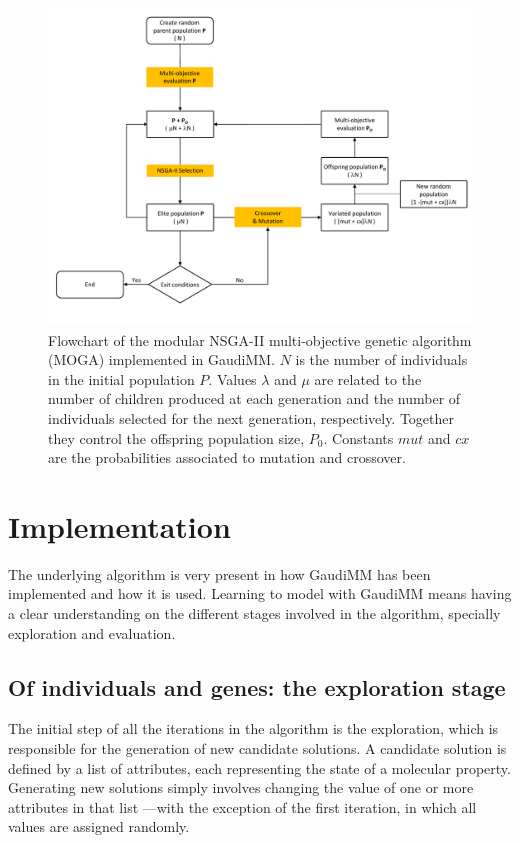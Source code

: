 \begin{figure} %
	\vspace*{-1cm}
	\includegraphics[width=0.85\textheight,angle=90]{./figures/04/nsga.pdf}
	\cprotect\caption[NSGA-II algorithm]{Flowchart of the modular NSGA-II multi-objective genetic algorithm (MOGA) implemented in GaudiMM. $ N $ is the number of individuals in the initial population $P$. Values $\lambda$ and $\mu$ are related to the number of children produced at each generation and the number of individuals selected for the next generation, respectively. Together they control the offspring population size, $ P_{0} $. Constants $ mut $ and $ cx $ are the probabilities associated to mutation and crossover.}
	\label{fig:nsga}
\end{figure}


\section{Implementation}

The underlying algorithm is very present in how GaudiMM has been implemented and how it is used. Learning to model with GaudiMM means having a clear understanding on the different stages involved in the algorithm, specially exploration and evaluation.

\subsection{Of individuals and genes: the exploration stage}
The initial step of all the iterations in the algorithm is the exploration, which is responsible for the generation of new candidate solutions. A candidate solution is defined by a list of attributes, each representing the state of a molecular property. Generating new solutions simply involves changing the value of one or more attributes in that list ---with the exception of the first iteration, in which all values are assigned randomly.


